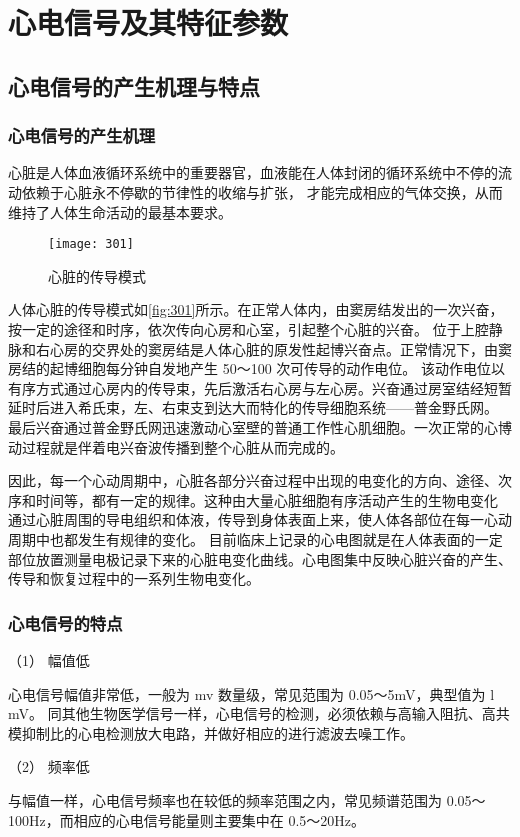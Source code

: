\chapter{心电信号及其特征参数 }
\section{心电信号的产生机理与特点}
\subsection{心电信号的产生机理} 
心脏是人体血液循环系统中的重要器官，血液能在人体封闭的循环系统中不停的流动依赖于心脏永不停歇的节律性的收缩与扩张，
才能完成相应的气体交换，从而维持了人体生命活动的最基本要求\cite{8}。 
\begin{figure}[htbp]
    \centering
    \texttt{[image: 301]}
    \caption{\label{fig:301}心脏的传导模式}
\end{figure}

人体心脏的传导模式如\autoref{fig:301}所示。在正常人体内，由窦房结发出的一次兴奋，按一定的途径和时序，依次传向心房和心室，引起整个心脏的兴奋。
位于上腔静脉和右心房的交界处的窦房结是人体心脏的原发性起博兴奋点。正常情况下，由窦房结的起博细胞每分钟自发地产生 50～100 次可传导的动作电位。
该动作电位以有序方式通过心房内的传导束，先后激活右心房与左心房。兴奋通过房室结经短暂延时后进入希氏束，左、右束支到达大而特化的传导细胞系统——普金野氏网。
最后兴奋通过普金野氏网迅速激动心室壁的普通工作性心肌细胞。一次正常的心博动过程就是伴着电兴奋波传播到整个心脏从而完成的。 

因此，每一个心动周期中，心脏各部分兴奋过程中出现的电变化的方向、途径、次序和时间等，都有一定的规律。这种由大量心脏细胞有序活动产生的生物电变化
通过心脏周围的导电组织和体液，传导到身体表面上来，使人体各部位在每一心动周期中也都发生有规律的变化。
目前临床上记录的心电图就是在人体表面的一定部位放置测量电极记录下来的心脏电变化曲线。心电图集中反映心脏兴奋的产生、传导和恢复过程中的一系列生物电变化。 
\subsection{心电信号的特点}
（1）	幅值低 

心电信号幅值非常低，一般为 mv 数量级，常见范围为 0.05～5mV，典型值为 l mV。 
同其他生物医学信号一样，心电信号的检测，必须依赖与高输入阻抗、高共模抑制比的心电检测放大电路，并做好相应的进行滤波去噪工作。 

（2）	频率低 

与幅值一样，心电信号频率也在较低的频率范围之内，常见频谱范围为 0.05～100Hz，而相应的心电信号能量则主要集中在 0.5～20Hz。 

